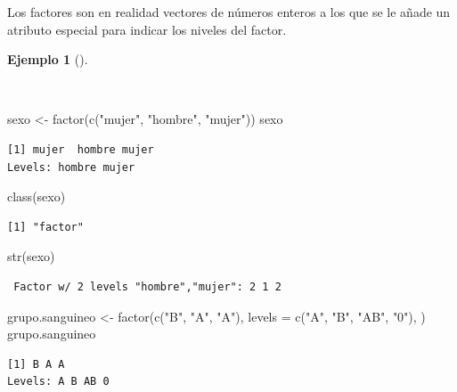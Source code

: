 \documentclass[
  a4paper,
]{scrreport}
\newenvironment{Shaded}{\begin{snugshade}}{\end{snugshade}}
\newcommand{\AttributeTok}[1]{\textcolor[rgb]{0.40,0.45,0.13}{#1}}
\newcommand{\FunctionTok}[1]{\textcolor[rgb]{0.28,0.35,0.67}{#1}}
\newcommand{\NormalTok}[1]{\textcolor[rgb]{0.00,0.23,0.31}{#1}}
\newcommand{\OtherTok}[1]{\textcolor[rgb]{0.00,0.23,0.31}{#1}}
\newcommand{\StringTok}[1]{\textcolor[rgb]{0.13,0.47,0.30}{#1}}
\theoremstyle{definition}
\theoremstyle{definition}
\newtheorem{example}{Ejemplo}[chapter]
\theoremstyle{remark}
\begin{document}
Los factores son en realidad vectores de números enteros a los que se le
añade un atributo especial para indicar los niveles del factor.

\begin{example}[]\protect\hypertarget{exm-creacion-factores}{}\label{exm-creacion-factores}

~

\begin{Shaded}
\begin{Highlighting}[]
\NormalTok{sexo }\OtherTok{\textless{}{-}} \FunctionTok{factor}\NormalTok{(}\FunctionTok{c}\NormalTok{(}\StringTok{"mujer"}\NormalTok{, }\StringTok{"hombre"}\NormalTok{, }\StringTok{"mujer"}\NormalTok{))}
\NormalTok{sexo}
\end{Highlighting}
\end{Shaded}

\begin{verbatim}
[1] mujer  hombre mujer 
Levels: hombre mujer
\end{verbatim}

\begin{Shaded}
\begin{Highlighting}[]
\FunctionTok{class}\NormalTok{(sexo)}
\end{Highlighting}
\end{Shaded}

\begin{verbatim}
[1] "factor"
\end{verbatim}

\begin{Shaded}
\begin{Highlighting}[]
\FunctionTok{str}\NormalTok{(sexo)}
\end{Highlighting}
\end{Shaded}

\begin{verbatim}
 Factor w/ 2 levels "hombre","mujer": 2 1 2
\end{verbatim}

\begin{Shaded}
\begin{Highlighting}[]
\NormalTok{grupo.sanguineo }\OtherTok{\textless{}{-}} \FunctionTok{factor}\NormalTok{(}\FunctionTok{c}\NormalTok{(}\StringTok{"B"}\NormalTok{, }\StringTok{"A"}\NormalTok{, }\StringTok{"A"}\NormalTok{), }\AttributeTok{levels =} \FunctionTok{c}\NormalTok{(}\StringTok{"A"}\NormalTok{, }\StringTok{"B"}\NormalTok{, }\StringTok{"AB"}\NormalTok{, }\StringTok{"0"}\NormalTok{), )}
\NormalTok{grupo.sanguineo}
\end{Highlighting}
\end{Shaded}

\begin{verbatim}
[1] B A A
Levels: A B AB 0
\end{verbatim}

\end{example}
\end{document}
